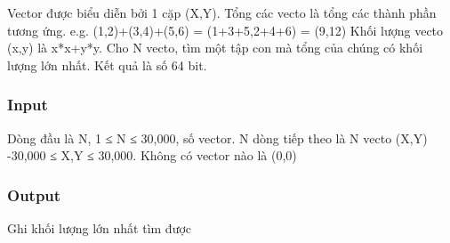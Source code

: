 







   Vector được biểu diễn bởi 1 cặp (X,Y). Tổng các vecto là tổng các thành phần tương ứng. e.g. (1,2)+(3,4)+(5,6) = (1+3+5,2+4+6) = (9,12)  Khối lượng vecto (x,y) là x*x+y*y.  Cho N vecto, tìm một tập con mà tổng của chúng có khối lượng lớn nhất. Kết quả là số 64 bit.  

\subsubsection{   Input  }

   Dòng đầu là N, 1 ≤ N ≤ 30,000, số vector. N dòng tiếp theo là N vecto (X,Y) -30,000 ≤ X,Y ≤ 30,000. Không có vector nào là (0,0)  

\subsubsection{   Output  }

   Ghi khối lượng lớn nhất tìm được  

